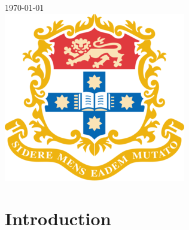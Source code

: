 \begin{titlepage}


{\large \today}\\[2cm] %


\includegraphics{logo.png}\\[1cm] %
 

\vfill %

\end{titlepage}



\section{Introduction}

